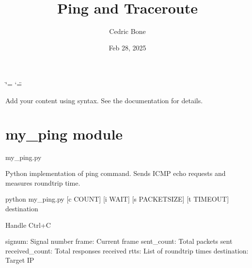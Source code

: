\documentclass[letterpaper,10pt,english]{sphinxmanual}
\title{Ping and Traceroute}
\date{Feb 28, 2025}
\author{Cedric Bone}
\begin{document}
\ifdefined\shorthandoff
  \ifnum\catcode`\=\string=\active\shorthandoff{=}\fi
  \ifnum\catcode`\"=\active{}\fi
\fi

\pagestyle{empty}
\sphinxmaketitle
\pagestyle{plain}
\sphinxtableofcontents
\pagestyle{normal}
\label{\detokenize{index::doc}}


\sphinxAtStartPar
Add your content using  syntax. See the
documentation for details.

\sphinxstepscope


\chapter{my\_ping module}
\label{\detokenize{my_ping:module-my_ping}}\label{\detokenize{my_ping:my-ping-module}}\label{\detokenize{my_ping::doc}}
\sphinxAtStartPar
my\_ping.py

\sphinxAtStartPar
Python implementation of ping command.
Sends ICMP echo requests and measures round\sphinxhyphen{}trip time.
\begin{description}
\sphinxAtStartPar
python my\_ping.py {[}\sphinxhyphen{}c COUNT{]} {[}\sphinxhyphen{}i WAIT{]} {[}\sphinxhyphen{}s PACKETSIZE{]} {[}\sphinxhyphen{}t TIMEOUT{]} destination

\end{description}

\begin{fulllineitems}
\label{\detokenize{my_ping:my_ping.handle_interrupt}}
\pysigstartsignatures
\pysiglinewithargsret
{}
{\sphinxparamcomma {}\sphinxparamcomma {}\sphinxparamcomma {}\sphinxparamcomma {}\sphinxparamcomma {}}
{}
\pysigstopsignatures
\sphinxAtStartPar
Handle Ctrl+C
\begin{description}
\sphinxAtStartPar
signum: Signal number
frame: Current frame
sent\_count: Total packets sent
received\_count: Total responses received
rtts: List of round\sphinxhyphen{}trip times
destination: Target IP

\end{description}

\end{fulllineitems}
\end{document}
